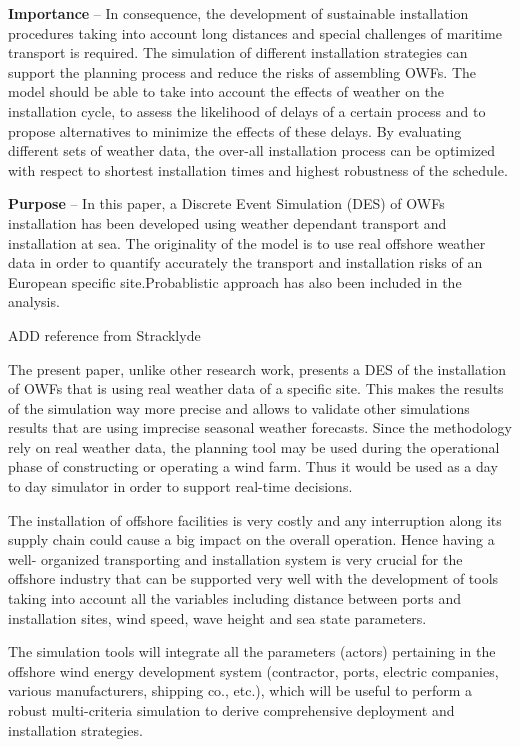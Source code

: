 
\textbf{Importance} --
In consequence, the development of sustainable installation procedures taking into account long distances and special challenges of maritime transport is required. The simulation of different installation strategies can support the planning process and reduce the risks of assembling OWFs. The model should be able to take into account the effects of weather on the installation cycle, to assess the likelihood of delays of a certain process and to propose alternatives to minimize the effects of these delays. By evaluating different sets of weather data, the over-all installation process can be optimized with respect to shortest installation times and highest robustness of the schedule.

\textbf{Purpose} --
In this paper, a Discrete Event Simulation (DES) of OWFs installation has been developed using weather dependant transport and installation at sea. The originality of the model is to use real offshore weather data in order to quantify accurately the transport and installation risks of an European specific site.Probablistic approach has also been included in the analysis.


ADD reference from Stracklyde

The present paper, unlike other research work, presents a DES of the installation of OWFs that is using real weather data of a specific site. This makes the results of the simulation way more precise and allows to validate other simulations results that are using imprecise seasonal weather forecasts. Since the methodology rely on real weather data, the planning tool may be used during the operational phase of constructing or operating a wind farm. Thus it would be used as a day to day simulator in order to support real-time decisions.


The installation of offshore facilities is very costly and any interruption along its supply chain could cause a big impact on the overall operation. Hence having a well- organized transporting and installation system is very crucial for the offshore industry that can be supported very well with the development of tools taking into account all the variables including distance between ports and installation sites, wind speed, wave height and sea state parameters.

The simulation tools will integrate all the parameters (actors) pertaining in the offshore wind energy development system (contractor, ports, electric companies, various manufacturers, shipping co., etc.), which will be useful to perform a robust multi-criteria simulation to derive comprehensive deployment and installation strategies.

